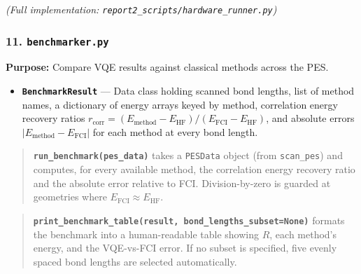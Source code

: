\documentclass[
  11pt,
]{report}
\providecommand{\tightlist}{%
  \setlength{\itemsep}{0pt}\setlength{\parskip}{0pt}}
\begin{document}
\emph{(Full implementation:
\texttt{report2\_scripts/hardware\_runner.py})}

\subsubsection{\texorpdfstring{11.
\texttt{benchmarker.py}}{11. benchmarker.py}}\label{benchmarker.py}

\textbf{Purpose:} Compare VQE results against classical methods across
the PES.

\begin{itemize}
\tightlist
\item
  \textbf{\texttt{BenchmarkResult}} --- Data class holding scanned bond
  lengths, list of method names, a dictionary of energy arrays keyed by
  method, correlation energy recovery ratios
  \(r_{\text{corr}} = (E_{\text{method}} - E_{\text{HF}}) / (E_{\text{FCI}} - E_{\text{HF}})\),
  and absolute errors \(|E_{\text{method}} - E_{\text{FCI}}|\) for each
  method at every bond length.
\end{itemize}

\begin{quote}
\textbf{\texttt{run\_benchmark(pes\_data)}} takes a \texttt{PESData}
object (from \texttt{scan\_pes}) and computes, for every available
method, the correlation energy recovery ratio and the absolute error
relative to FCI. Division-by-zero is guarded at geometries where
\(E_{\text{FCI}} \approx E_{\text{HF}}\).
\end{quote}

\begin{quote}
\textbf{\texttt{print\_benchmark\_table(result,\ bond\_lengths\_subset=None)}}
formats the benchmark into a human-readable table showing \(R\), each
method's energy, and the VQE-vs-FCI error. If no subset is specified,
five evenly spaced bond lengths are selected automatically.
\end{quote}
\end{document}
